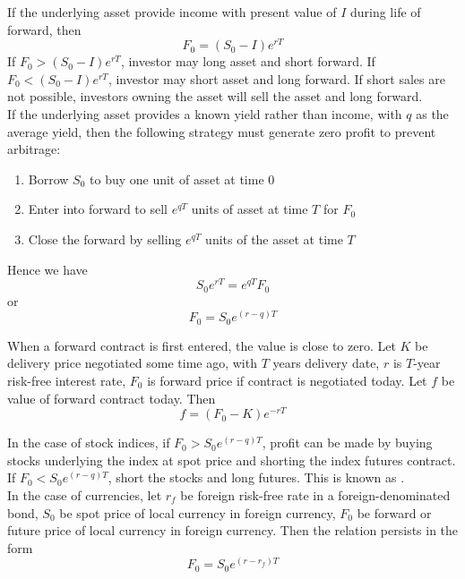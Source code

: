 If the underlying asset provide income with present value of $I$ during life of forward, then
\begin{equation*}
F_0 = (S_0 - I)e^{rT} \nonumber
\end{equation*}
If $F_0 > (S_0 - I)e^{rT}$, investor may long asset and short forward. If $F_0 < (S_0 - I)e^{rT}$, investor may short asset and long forward. If short sales are not possible, investors owning the asset will sell the asset and long forward.\\

If the underlying asset provides a known yield rather than income, with $q$ as the average yield, then the following strategy must generate zero profit to prevent arbitrage:
\begin{enumerate}[label=\arabic*.]
\setlength{\itemsep}{0pt}
\item Borrow $S_0$ to buy one unit of asset at time $0$
\item Enter into forward to sell $e^{qT}$ units of asset at time $T$ for $F_0$
\item Close the forward by selling $e^{qT}$ units of the asset at time $T$
\end{enumerate}
Hence we have
\begin{equation*}
S_0 e^{rT} = e^{qT} F_0 \nonumber 
\end{equation*}
or
\begin{equation*}
F_0 = S_0 e^{(r-q)T} \nonumber
\end{equation*}

When a forward contract is first entered, the value is close to zero. Let $K$ be delivery price negotiated some time ago, with $T$ years delivery date, $r$ is $T$-year risk-free interest rate, $F_0$ is forward price if contract is negotiated today. Let $f$ be value of forward contract today. Then
\begin{equation*}
f = (F_0 - K)e^{-rT} \nonumber
\end{equation*}

In the case of stock indices, if $F_0 > S_0 e^{(r-q)T}$, profit can be made by buying stocks underlying the index at spot price and shorting the index futures contract. If $F_0 < S_0 e^{(r-q)T}$, short the stocks and long futures. This is known as .\\

In the case of currencies, let $r_f$ be foreign risk-free rate in a foreign-denominated bond, $S_0$ be spot price of local currency in foreign currency, $F_0$ be forward or future price of local currency in foreign currency. Then the  relation persists in the form
\begin{equation*}
F_0 = S_0 e^{(r-r_f)T} \nonumber
\end{equation*}

